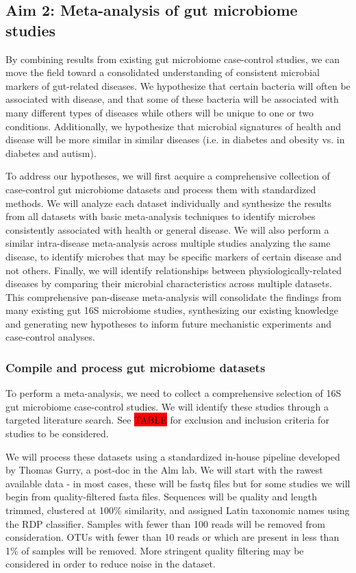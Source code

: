 \documentclass[12pt]{article}
\begin{document}
\subsection{Aim 2: Meta-analysis of gut microbiome studies}\label{sec:aim2}
By combining results from existing gut microbiome case-control 
studies, we can move the field toward a consolidated understanding of 
consistent microbial markers of gut-related diseases. We hypothesize 
that certain bacteria will often be associated with disease, and that 
some of these bacteria will be associated with many different types of 
diseases while others will be unique to one or two conditions. 
Additionally, we hypothesize that microbial signatures  of health and 
disease will be more similar in similar diseases (i.e. in diabetes and 
obesity vs. in diabetes and autism).

To address our hypotheses, we will first acquire a comprehensive
collection of case-control gut microbiome datasets and process them
with standardized methods. We will analyze each dataset individually
and synthesize the results from all datasets with basic meta-analysis 
techniques to identify microbes consistently associated with health or 
general disease. We will also perform a similar intra-disease meta-analysis 
across multiple studies analyzing the same disease, to identify microbes
that may be specific markers of certain disease and not others.
Finally, we will identify relationships between physiologically-related 
diseases by comparing their microbial characteristics across multiple
datasets. This comprehensive pan-disease meta-analysis will
consolidate the findings from many existing gut 16S microbiome studies,
synthesizing our existing knowledge and generating new hypotheses to
inform future mechanistic experiments and case-control analyses.

\subsubsection{Compile and process gut microbiome datasets}
To perform a meta-analysis, we need to collect a 
comprehensive selection of 16S gut microbiome case-control studies. We 
will identify these studies through a targeted literature search.  See 
\colorbox{red}{TABLE} for exclusion and inclusion criteria for studies to be 
considered.

We will process these datasets using a standardized in-house pipeline 
developed by Thomas Gurry, a post-doc in the Alm lab. We will 
start with the rawest available data - in most cases, these will be 
fastq files but for some studies we will begin from quality-filtered 
fasta files. Sequences will be quality and length trimmed, clustered 
at 100\% similarity, and assigned Latin taxonomic names using the RDP 
classifier. Samples with fewer than 100 reads will be removed from 
consideration. OTUs with fewer than 10 reads or which are present in 
less than 1\% of samples will be removed. More stringent quality 
filtering may be considered in order to reduce noise in the dataset.
\end{document}
